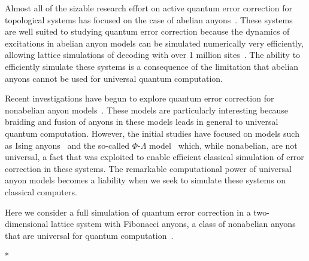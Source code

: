 \documentclass[aps, prl, letterpaper, twocolumn, superscriptaddress, notitlepage]{revtex4-1}
\begin{document}
Almost all of the sizable research effort on active quantum error correction for topological systems has focused on the case of abelian anyons~\cite{Terhal2014}. These systems are well suited to studying quantum error correction because the dynamics of excitations in abelian anyon models can be simulated numerically very efficiently, allowing lattice simulations of decoding with over 1 million sites~\cite{Duclos-Cianci2010}. The ability to efficiently simulate these systems is a consequence of the limitation that abelian anyons cannot be used for universal quantum computation. 

Recent investigations have begun to explore quantum error correction for nonabelian anyon models~\cite{Brell2013, Wootton2013, Hutter2014}. These models are particularly interesting because braiding and fusion of anyons in these models leads in general to universal quantum computation. However, the initial studies have focused on models such as Ising anyons~\cite{Brell2013} and the so-called $\Phi$-$\Lambda$ model~\cite{Wootton2013, Hutter2014} which, while nonabelian, are not universal, a fact that was exploited to enable efficient classical simulation of error correction in these systems. The remarkable computational power of universal anyon models becomes a liability when we seek to simulate these systems on classical computers. 

Here we consider a full simulation of quantum error correction in a two-dimensional lattice system with Fibonacci anyons, a class of nonabelian anyons that are universal for quantum computation~\cite{Wang2010b}. 



\/* %
\end{document}
